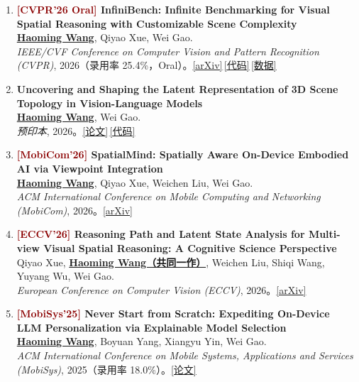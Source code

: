 \documentclass[10pt,letterpaper,fontset=fandol]{ctexart}
\newenvironment{publist}{
  \begin{enumerate}[leftmargin=1.65em,itemsep=3pt,parsep=0pt,topsep=2pt,
                    label=\arabic*.,ref=\arabic*,series=pubs]
}{\end{enumerate}}
\newcommand{\me}{\underline{\textbf{Haoming Wang}}}
\newcommand{\meco}{\underline{\textbf{Haoming Wang（共同一作）}}}
\begin{document}
\begin{publist}
\item\label{pub:infinibench} \textbf{\textcolor{darkred}{[CVPR'26 Oral]} InfiniBench: Infinite Benchmarking for Visual Spatial Reasoning with Customizable Scene Complexity}\\
\me, Qiyao Xue, Wei Gao.\\
\textit{IEEE/CVF Conference on Computer Vision and Pattern Recognition (CVPR)}, 2026（录用率 25.4\%，Oral）。\href{https://arxiv.org/abs/2511.18200}{[arXiv]}\,\href{https://github.com/pittisl/infinibench}{[代码]}\,\href{https://huggingface.co/datasets/Haoming645/infinibench}{[数据]}

\item\label{pub:vlmlatent} \textbf{Uncovering and Shaping the Latent Representation of 3D Scene Topology in Vision-Language Models}\\
\me, Wei Gao.\\
\textit{预印本}, 2026。\href{https://haomingwang645.github.io/pdfs/arxiv26_vlm_latent_shaping.pdf}{[论文]}\,\href{https://github.com/pittisl/vlm-latent-shaping}{[代码]}

\item\label{pub:spatialmind} \textbf{\textcolor{darkred}{[MobiCom'26]} SpatialMind: Spatially Aware On-Device Embodied AI via Viewpoint Integration}\\
\me, Qiyao Xue, Weichen Liu, Wei Gao.\\
\textit{ACM International Conference on Mobile Computing and Networking (MobiCom)}, 2026。\href{https://www.arxiv.org/abs/2602.07082}{[arXiv]}

\item\label{pub:reasoningpath} \textbf{\textcolor{darkred}{[ECCV'26]} Reasoning Path and Latent State Analysis for Multi-view Visual Spatial Reasoning: A Cognitive Science Perspective}\\
Qiyao Xue, \meco, Weichen Liu, Shiqi Wang, Yuyang Wu, Wei Gao.\\
\textit{European Conference on Computer Vision (ECCV)}, 2026。\href{https://arxiv.org/abs/2512.02340}{[arXiv]}

\item\label{pub:xpert} \textbf{\textcolor{darkred}{[MobiSys'25]} Never Start from Scratch: Expediting On-Device LLM Personalization via Explainable Model Selection}\\
\me, Boyuan Yang, Xiangyu Yin, Wei Gao.\\
\textit{ACM International Conference on Mobile Systems, Applications and Services (MobiSys)}, 2025（录用率 18.0\%）。\href{https://haomingwang645.github.io/pdfs/xpert_paper.pdf}{[论文]}


\end{publist}
\end{document}
